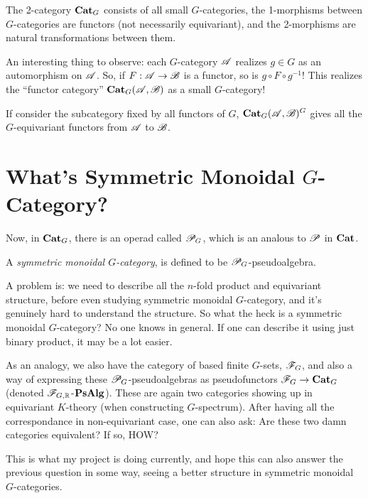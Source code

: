 \documentclass{article}
\begin{document}
\begin{defn}
    The 2-category $\mathbf{Cat}_G$ consists of all small $G$-categories, the 1-morphisms between $G$-categories are functors (not necessarily equivariant), and the 2-morphisms are natural transformations between them.
\end{defn}

An interesting thing to observe: each $G$-category $\mathscr{A}$ realizes $g\in G$ as an automorphism on $\mathscr{A}$. So, if $F:\mathscr{A}\rightarrow\mathscr{B}$ is a functor, so is $g\circ F\circ g^{-1}$! This realizes the ``functor category'' $\mathbf{Cat}_G(\mathscr{A},\mathscr{B})$ as a small $G$-category! 

If consider the subcategory fixed by all functors of $G$, $\mathbf{Cat}_G(\mathscr{A},\mathscr{B})^G$ gives all the $G$-equivariant functors from $\mathscr{A}$ to $\mathscr{B}$.

\hfil

\section{What's Symmetric Monoidal $G$-Category?}

\hfil

Now, in $\mathbf{Cat}_G$, there is an operad called $\mathscr{P}_G$, which is an analous to $\mathscr{P}$ in $\mathbf{Cat}$. 

\begin{defn}
A \emph{symmetric monoidal $G$-category}, is defined to be $\mathscr{P}_G$-pseudoalgebra.
\end{defn}

A problem is: we need to describe all the $n$-fold product and equivariant structure, before even studying symmetric monoidal $G$-category, and it's genuinely hard to understand the structure. So what the heck is a symmetric monoidal $G$-category? No one knows in general. If one can describe it using just binary product, it may be a lot easier.

\hfil

As an analogy, we also have the category of based finite $G$-sets, $\mathscr{F}_G$, and also a way of expressing these $\mathscr{P}_G$-pseudoalgebras as pseudofunctors $\mathscr{F}_G\rightarrow \mathbf{Cat}_G$ (denoted $\mathscr{F}_{G,\mathbb{R}}$-$\mathbf{PsAlg}$). These are again two categories showing up in equivariant $K$-theory (when constructing $G$-spectrum). After having all the correspondance in non-equivariant case, one can also ask: Are these two damn categories equivalent? If so, HOW?

This is what my project is doing currently, and hope this can also answer the previous question in some way, seeing a better structure in symmetric monoidal $G$-categories.
\end{document}
